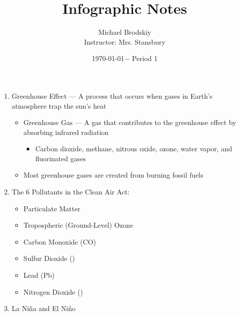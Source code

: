 \documentclass[12pt]{article}
\title{Infographic Notes}
\date{\today $-$ Period 1}
\author{Michael Brodskiy\\ \small Instructor: Mrs. Stansbury}
\begin{document}
\maketitle

\begin{enumerate}

  \item Greenhouse Effect — A process that occurs when gases in Earth's atmosphere trap the sun's heat

    \begin{itemize}

      \item Greenhouse Gas — A gas that contributes to the greenhouse effect by absorbing infrared radiation

        \begin{itemize}

          \item Carbon dioxide, methane, nitrous oxide, ozone, water vapor, and fluorinated gases

        \end{itemize}

      \item Most greenhouse gases are created from burning fossil fuels

    \end{itemize}

  \item The 6 Pollutants in the Clean Air Act:

    \begin{itemize}

      \item Particulate Matter

      \item Tropospheric (Ground-Level) Ozone

      \item Carbon Monoxide (CO)

      \item Sulfur Dioxide ()

      \item Lead (Pb)

      \item Nitrogen Dioxide ()

    \end{itemize}

  \item La Ni\~na and El Ni\~no

    \begin{itemize}


\end{itemize}
\end{enumerate}
\end{document}
